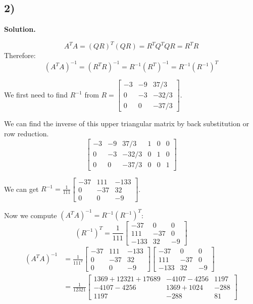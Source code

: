 \documentclass{article}
\newcommand{\0}{{\mathbf{0}}} %
\begin{document}
\subsection*{2)}
\textbf{Solution.}

$$ A^T A = (QR)^T (QR) = R^T Q^T Q R = R^T R $$
Therefore:
$$ (A^T A)^{-1} = (R^T R)^{-1} = R^{-1} (R^T)^{-1} = R^{-1} (R^{-1})^T $$

We first need to find $R^{-1}$ from $R =
\begin{bmatrix} -3 & -9 & 37/3 \\ 0 & -3 & -32/3 \\ 0 & 0 & -37/3
\end{bmatrix}$.

We can find the inverse of this upper triangular matrix by back substitution or row reduction.
$$ \left[
\begin{array}{ccc|ccc} -3 & -9 & 37/3 & 1 & 0 & 0 \\ 0 & -3 & -32/3 & 0 & 1 & 0 \\ 0 & 0 & -37/3 & 0 & 0 & 1
\end{array} \right] $$

We can get $R^{-1} = \frac{1}{111}
\begin{bmatrix} -37 & 111 & -133 \\ 0 & -37 & 32 \\ 0 & 0 & -9
\end{bmatrix}$.

Now we compute $(A^T A)^{-1} = R^{-1} (R^{-1})^T$:
$$ (R^{-1})^T = \frac{1}{111}
\begin{bmatrix} -37 & 0 & 0 \\ 111 & -37 & 0 \\ -133 & 32 & -9
\end{bmatrix} $$
\begin{align*}
(A^T A)^{-1} &= \frac{1}{111^2}
\begin{bmatrix} -37 & 111 & -133 \\ 0 & -37 & 32 \\ 0 & 0 & -9
\end{bmatrix}
\begin{bmatrix} -37 & 0 & 0 \\ 111 & -37 & 0 \\ -133 & 32 & -9
\end{bmatrix} \\
&= \frac{1}{12321}
\begin{bmatrix} 1369 + 12321 + 17689 & -4107 - 4256 & 1197 \\ -4107 - 4256 & 1369 + 1024 & -288 \\ 1197 & -288 & 81
\end{bmatrix}
\end{align*}
\end{document}
